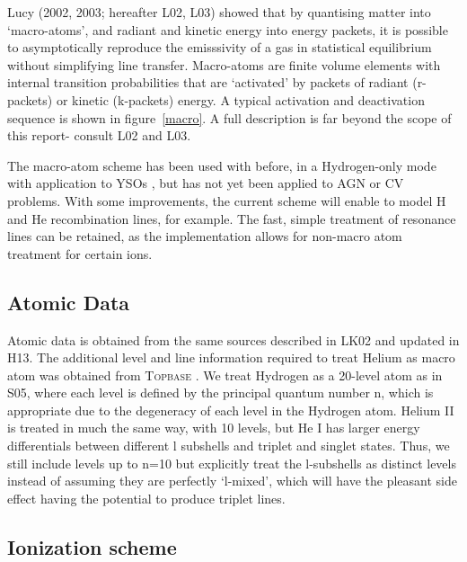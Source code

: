 \documentclass[useAMS,usenatbib, onecolumn]{mn2ejm}
\begin{document}
Lucy (2002, 2003\nocite{lucy2002, lucy2003}; hereafter L02, L03) showed that by quantising matter into `macro-atoms', and radiant and kinetic energy into energy packets, it is possible to asymptotically reproduce the emisssivity of a gas in statistical equilibrium without simplifying line transfer. Macro-atoms are finite volume elements with internal transition probabilities that are `activated' by packets of radiant (r-packets) or kinetic (k-packets) energy. A typical activation and deactivation sequence is shown in figure~\ref{macro}.
A full description is far beyond the scope of this report- consult L02 and L03. 

The macro-atom scheme has been used with \py before, in a Hydrogen-only mode with application to YSOs \citep{simmacro2005}, but has not yet been applied to AGN or CV problems. With some improvements, the current scheme will enable \py to model H and He recombination lines, for example. The fast, simple treatment of resonance lines 
can be retained, as the \py implementation allows for non-macro atom treatment for certain ions.

\subsection{Atomic Data}

Atomic data is obtained from the same sources described in LK02 and updated in H13. 
The additional level and line information required to treat Helium as macro atom was 
obtained from \textsc{Topbase} \citep{topbase2005}. We treat Hydrogen as a 20-level atom as in S05, where 
each level is defined by the principal quantum number n, which is appropriate due to
the degeneracy of each level in the Hydrogen atom. Helium II is treated in much the same way,
with 10 levels, but He I has larger energy differentials between different l subshells
and triplet and singlet states. Thus, we still include levels up to n=10 but explicitly 
treat the l-subshells as distinct levels instead of assuming they are perfectly `l-mixed',
which will have the pleasant side effect having the potential to produce triplet lines.

\subsection{Ionization scheme}
\end{document}
